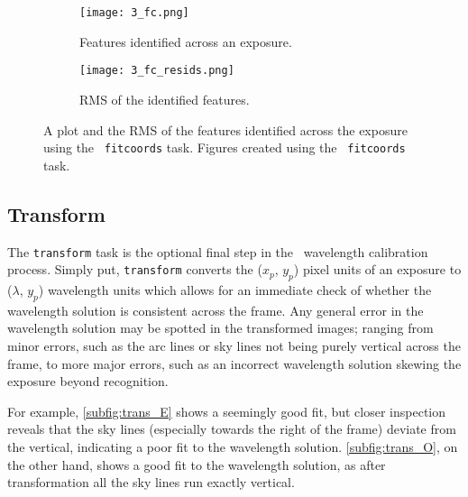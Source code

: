 \begin{figure}
    \centering
    \begin{subfigure}[b]{0.49\textwidth}
        \centering
        \texttt{[image: 3\_fc.png]}
        \caption{Features identified across an exposure.}
    \end{subfigure}
    \hfill
    \begin{subfigure}[b]{0.49\textwidth}
        \centering
        \texttt{[image: 3\_fc\_resids.png]}
        \caption{\gls{RMS} of the identified features.}
    \end{subfigure}
    \caption{
        A plot and the \gls{RMS} of the features identified across the exposure using the \iraf\ \texttt{fitcoords} task.
        Figures created using the \iraf\ \texttt{fitcoords} task.
    }
    \label{fig:iraf_fc_plot}
\end{figure}

\subsection{Transform} \label{subsec:iraf_transform}

The \texttt{transform} task is the optional final step in the \iraf\ wavelength calibration process.
Simply put, \texttt{transform} converts the ($x_p$, $y_p$) pixel units of an exposure to ($\lambda$, $y_p$) wavelength units which allows for an immediate check of whether the wavelength solution is consistent across the frame.
Any general error in the wavelength solution may be spotted in the transformed images; ranging from minor errors, such as the arc lines or sky lines not being purely vertical across the frame, to more major errors, such as an incorrect wavelength solution skewing the exposure beyond recognition.

For example, \autoref{subfig:trans_E} shows a seemingly good fit, but closer inspection reveals that the sky lines (especially towards the right of the frame) deviate from the vertical, indicating a poor fit to the wavelength solution.
\autoref{subfig:trans_O}, on the other hand, shows a good fit to the wavelength solution, as after transformation all the sky lines run exactly vertical.

